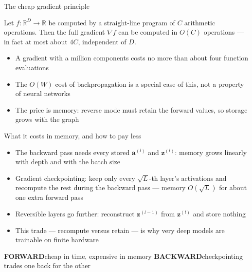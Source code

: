 \documentclass[aspectratio=169, 11pt]{beamer}
\newcommand{\fbpar}[2]{%
  \vfill
  {\scriptsize
  \begin{tcolorbox}[enhanced, sidebyside, sidebyside align=top,
                    lefthand ratio=0.485,
                    segmentation style={shc!35, line width=0.6pt},
                    colback=shc!5, colframe=shc!35, boxrule=0.5pt,
                    arc=1.2mm, left=1.6mm, right=1.6mm,
                    top=0.6mm, bottom=0.6mm,
                    before skip=0pt, after skip=0pt]
    {\color{shc}\textbf{FORWARD}}\hspace{0.55em}#1
  \tcblower
    {\color{dpc}\textbf{BACKWARD}}\hspace{0.55em}#2
  \end{tcolorbox}}%
  \vspace{0.35em}%
}
\newcommand{\src}[3]{}      %
\begin{document}
\begin{frame}{The cheap gradient principle}
  \src{baur1983}{section}{4}
  \src{baydin2018}{section}{3.2}
  \vspace{0.3em}
  \begin{theorem}
    {\small Let $f:\mathbb{R}^{D}\to\mathbb{R}$ be computed by a
    straight-line program of $C$ arithmetic operations. Then the full
    gradient $\nabla f$ can be computed in $O(C)$ operations ---
    in fact at most about $4C$, \alert{independent of $D$}.}
  \end{theorem}
  \vspace{0.5em}
  {\small
  \begin{itemize}\setlength{\itemsep}{4pt}
    \item A gradient with a million components costs no more than about
          four function evaluations
    \item The $O(W)$ cost of backpropagation is a \alert{special case}
          of this, not a property of neural networks
    \item The price is \alert{memory}: reverse mode must retain the
          forward values, so storage grows with the graph
  \end{itemize}}
\end{frame}

\begin{frame}{What it costs in memory, and how to pay less}
  \src{prince2023}{page}{114}
  \vspace{0.3em}
  {\small
  \begin{itemize}\setlength{\itemsep}{5pt}
    \item The backward pass needs every stored $\mathbf{a}^{(l)}$ and
          $\mathbf{z}^{(l)}$: memory grows \alert{linearly with depth}
          and with the batch size
    \item \alert{Gradient checkpointing}: keep only every
          $\sqrt{L}$-th layer's activations and recompute the rest
          during the backward pass --- memory $O(\sqrt{L})$ for about
          one extra forward pass
    \item \alert{Reversible layers} go further: reconstruct
          $\mathbf{z}^{(l-1)}$ from $\mathbf{z}^{(l)}$ and store
          nothing
    \item This trade --- recompute versus retain --- is why very deep
          models are trainable on finite hardware
  \end{itemize}}
  \fbpar{cheap in time, expensive in memory}
        {checkpointing trades one back for the other}
\end{frame}
\end{document}
